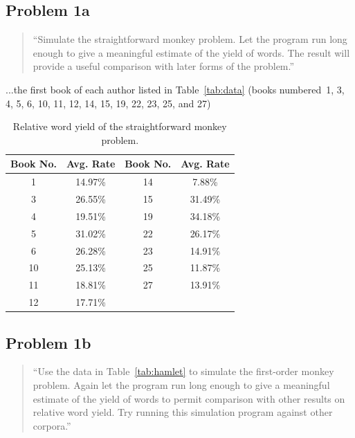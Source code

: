 \documentclass[conference]{IEEEtran}
\newcommand{\codefile}[1]{
  \begin{framed}
  \fontsize{5.65}{6.78}\selectfont
  
  \end{framed}
}
\begin{document}
\subsection{Problem 1a}
\label{sec:problem1}

\begin{quote}
``Simulate the straightforward monkey problem. Let the program run long enough to 
give a meaningful estimate of the yield of words. The result will provide a 
useful comparison with later forms of the problem.''
\end{quote}

...the first book of each author listed in Table~\ref{tab:data} (books numbered~1, 
3, 4, 5, 6, 10, 11, 12, 14, 15, 19, 22, 23, 25, and 27)

\codefile{problem1a.py}

\begin{table}
\caption{Relative word yield of the straightforward monkey problem.\label{tab:problem1a}}
\vspace{-10pt}
\begin{center}
\begin{tabular}{cccc}
\hline
Book No. & Avg. Rate & Book No. & Avg. Rate \\
\hline
1  & 14.97\% & 14 & 7.88\% \\
3  & 26.55\% & 15 & 31.49\% \\
4  & 19.51\% & 19 & 34.18\% \\
5  & 31.02\% & 22 & 26.17\% \\
6  & 26.28\% & 23 & 14.91\% \\
10 & 25.13\% & 25 & 11.87\% \\
11 & 18.81\% & 27 & 13.91\% \\
12 & 17.71\% & & \\
\hline
\end{tabular}
\end{center}
\end{table}


\subsection{Problem 1b}
\label{sec:problem1b}

\begin{quote}
``Use the data in Table~\ref{tab:hamlet} to simulate the first-order monkey problem. 
Again let the program run long enough to give a meaningful estimate of the yield 
of words to permit comparison with other results on relative word yield. Try running
this simulation program against other corpora.''
\end{quote}
\end{document}
